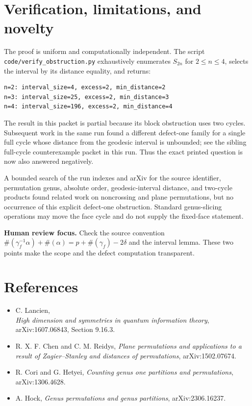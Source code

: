 \documentclass[11pt]{article}
\newcommand{\cyc}[1]{\#(#1)}
\begin{document}
\section*{Verification, limitations, and novelty}

The proof is uniform and computationally independent. The script
\texttt{code/verify\_obstruction.py} exhaustively enumerates \(S_{2n}\) for
\(2\leq n\leq4\), selects the interval by its distance equality, and returns:
\begin{verbatim}
n=2: interval_size=4, excess=2, min_distance=2
n=3: interval_size=25, excess=2, min_distance=3
n=4: interval_size=196, excess=2, min_distance=4
\end{verbatim}

The result in this packet is partial because its block obstruction uses two
cycles.  Subsequent work in the same run found a different defect-one family
for a single full cycle whose distance from the geodesic interval is
unbounded; see the sibling full-cycle counterexample packet in this run.
Thus the exact printed question is now also answered negatively.

A bounded search of the run indexes and arXiv for the source identifier,
permutation genus, absolute order, geodesic-interval distance, and two-cycle
products found related work on noncrossing and plane permutations, but no
occurrence of this explicit defect-one obstruction. Standard genus-slicing
operations may move the face cycle and do not supply the fixed-face statement.

\textbf{Human review focus.} Check the source convention
\(\cyc{\gamma_f^{-1}\alpha}+\cyc{\alpha}
=p+\cyc{\gamma_f}-2\delta\) and the interval lemma. These two points make
the scope and the defect computation transparent.

\section*{References}
\begin{itemize}
\item C. Lancien,\\
\emph{High dimension and symmetries in quantum information theory},
arXiv:1607.06843, Section 9.16.3.
\item R. X. F. Chen and C. M. Reidys, \emph{Plane permutations and
applications to a result of Zagier--Stanley and distances of permutations},
arXiv:1502.07674.
\item R. Cori and G. Hetyei, \emph{Counting genus one partitions and
permutations}, arXiv:1306.4628.
\item A. Hock, \emph{Genus permutations and genus partitions},
arXiv:2306.16237.
\end{itemize}
\end{document}
